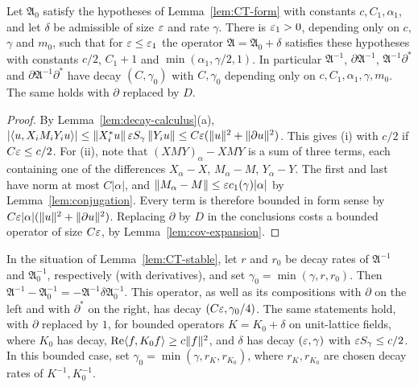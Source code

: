 \begin{lemma}\label{lem:CT-stable}
Let $\mathfrak A_0$ satisfy the hypotheses of Lemma~\ref{lem:CT-form} with constants $c,C_1,\alpha_1$, and let $\delta$ be admissible of size $\varepsilon$ and rate $\gamma$. There is $\varepsilon_1>0$, depending only on $c$, $\gamma$ and $m_0$, such that for $\varepsilon\le\varepsilon_1$ the operator $\mathfrak A=\mathfrak A_0+\delta$ satisfies these hypotheses with constants $c/2$, $C_1+1$ and $\min(\alpha_1,\gamma/2,1)$. In particular $\mathfrak A^{-1}$, $\partial\mathfrak A^{-1}$, $\mathfrak A^{-1}\partial^*$ and $\partial\mathfrak A^{-1}\partial^*$ have decay $(C,\gamma_0)$ with $C,\gamma_0$ depending only on $c,C_1,\alpha_1,\gamma,m_0$. The same holds with $\partial$ replaced by $D$.
\end{lemma}

\begin{proof}
By Lemma~\ref{lem:decay-calculus}(a), $|\langle u,X_iM_iY_iu\rangle|\le\|X_i^*u\|\,\varepsilon S_\gamma\,\|Y_iu\|\le C\varepsilon(\|u\|^2+\|\partial u\|^2)$. This gives (i) with $c/2$ if $C\varepsilon\le c/2$. For (ii), note that $(XMY)_\alpha-XMY$ is a sum of three terms, each containing one of the differences $X_\alpha-X$, $M_\alpha-M$, $Y_\alpha-Y$. The first and last have norm at most $C|\alpha|$, and $\|M_\alpha-M\|\le\varepsilon c_1(\gamma)|\alpha|$ by Lemma~\ref{lem:conjugation}. Every term is therefore bounded in form sense by $C\varepsilon|\alpha|(\|u\|^2+\|\partial u\|^2)$. Replacing $\partial$ by $D$ in the conclusions costs a bounded operator of size $C\varepsilon$, by Lemma~\ref{lem:cov-expansion}.
\end{proof}

\begin{lemma}\label{lem:perturbed-inverse}
In the situation of Lemma~\ref{lem:CT-stable}, let $r$ and $r_0$ be decay rates of $\mathfrak A^{-1}$ and $\mathfrak A_0^{-1}$, respectively (with derivatives), and set $\gamma_0=\min(\gamma,r,r_0)$. Then $\mathfrak A^{-1}-\mathfrak A_0^{-1}=-\mathfrak A^{-1}\delta\mathfrak A_0^{-1}$. This operator, as well as its compositions with $\partial$ on the left and with $\partial^*$ on the right, has decay $(C\varepsilon,\gamma_0/4)$. The same statements hold, with $\partial$ replaced by $1$, for bounded operators $K=K_0+\delta$ on unit-lattice fields, where $K_0$ has decay, $\operatorname{Re}\langle f,K_0f\rangle\ge c\|f\|^2$, and $\delta$ has decay $(\varepsilon,\gamma)$ with $\varepsilon S_\gamma\le c/2$. In this bounded case, set $\gamma_0=\min(\gamma,r_K,r_{K_0})$, where $r_K,r_{K_0}$ are chosen decay rates of $K^{-1},K_0^{-1}$.
\end{lemma}

